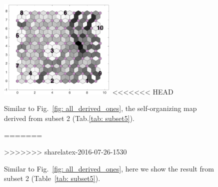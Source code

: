 \begin{figure}
        \centering
        \includegraphics[width=0.5\textwidth]{../../images0.01/M31/2D/image_subsets/subset5_dist_with_hits_t.png}
<<<<<<< HEAD
    \caption{Similar to Fig.~\ref{fig: all_derived_ones}, the self-organizing map derived  from subset 2 (Tab.\ref{tab: subset5}).}
=======
    \caption{Similar to Fig.~\ref{fig: all_derived_ones}, here we show the result from subset 2 (Table~\ref{tab: subset5}).}
>>>>>>> sharelatex-2016-07-26-1530
    \label{fig: subset5}
\end{figure}
